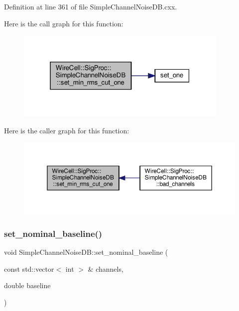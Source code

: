 Definition at line 361 of file Simple\+Channel\+Noise\+D\+B.\+cxx.

Here is the call graph for this function\+:
\nopagebreak
\begin{figure}[H]
\begin{center}
\leavevmode
\includegraphics[width=289pt]{class_wire_cell_1_1_sig_proc_1_1_simple_channel_noise_d_b_a110d73be2690691e60d916bf8cbb4ea9_cgraph}
\end{center}
\end{figure}
Here is the caller graph for this function\+:
\nopagebreak
\begin{figure}[H]
\begin{center}
\leavevmode
\includegraphics[width=350pt]{class_wire_cell_1_1_sig_proc_1_1_simple_channel_noise_d_b_a110d73be2690691e60d916bf8cbb4ea9_icgraph}
\end{center}
\end{figure}
\mbox{\label{class_wire_cell_1_1_sig_proc_1_1_simple_channel_noise_d_b_a566b36743c0a1cb0bd831a0086dad3b7}} 
\subsubsection{\texorpdfstring{set\+\_\+nominal\+\_\+baseline()}{set\_nominal\_baseline()}}
{\footnotesize\ttfamily void Simple\+Channel\+Noise\+D\+B\+::set\+\_\+nominal\+\_\+baseline (\begin{DoxyParamCaption}\item[{const std\+::vector$<$ int $>$ \&}]{channels,  }\item[{double}]{baseline }\end{DoxyParamCaption})}



